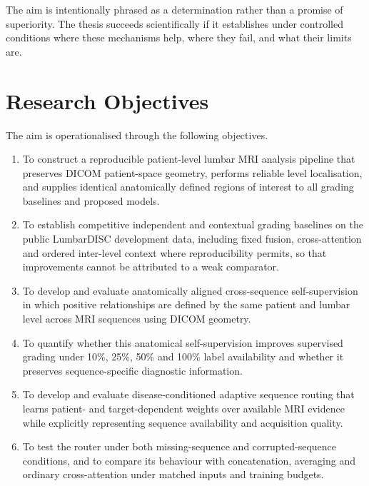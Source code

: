The aim is intentionally phrased as a determination rather than a promise of
superiority. The thesis succeeds scientifically if it establishes under controlled
conditions where these mechanisms help, where they fail, and what their limits are.

\section{Research Objectives}
\label{sec:intro-objectives}

The aim is operationalised through the following objectives.

\begin{enumerate}
  \item To construct a reproducible patient-level lumbar MRI analysis pipeline that
        preserves DICOM patient-space geometry, performs reliable level
        localisation, and supplies identical anatomically defined regions of
        interest to all grading baselines and proposed models.

  \item To establish competitive independent and contextual grading baselines on
        the public LumbarDISC development data, including fixed fusion,
        cross-attention and ordered inter-level context where reproducibility
        permits, so that improvements cannot be attributed to a weak comparator.

  \item To develop and evaluate anatomically aligned cross-sequence
        self-supervision in which positive relationships are defined by the same
        patient and lumbar level across MRI sequences using DICOM geometry.

  \item To quantify whether this anatomical self-supervision improves supervised
        grading under 10\%, 25\%, 50\% and 100\% label availability and whether it
        preserves sequence-specific diagnostic information.

  \item To develop and evaluate disease-conditioned adaptive sequence routing that
        learns patient- and target-dependent weights over available MRI evidence
        while explicitly representing sequence availability and acquisition quality.

  \item To test the router under both missing-sequence and corrupted-sequence
        conditions, and to compare its behaviour with concatenation, averaging and
        ordinary cross-attention under matched inputs and training budgets.


\end{enumerate}
